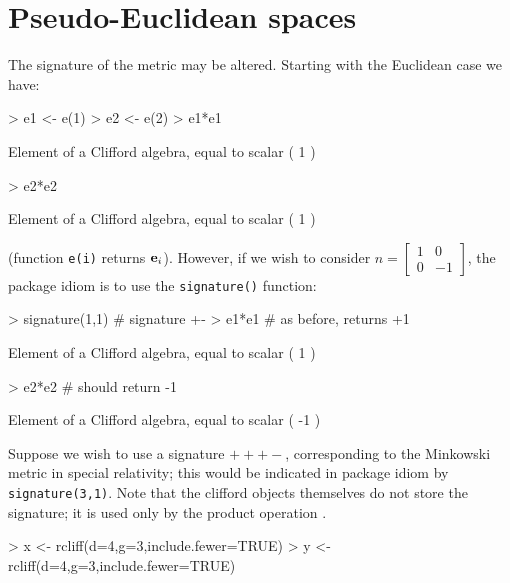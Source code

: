 \documentclass{article}
\begin{document}
\section{Pseudo-Euclidean spaces}

The signature of the metric may be altered.  Starting with the
Euclidean case we have:
    
\begin{Schunk}
\begin{Sinput}
> e1 <- e(1)
> e2 <- e(2)
> e1*e1
\end{Sinput}
\begin{Soutput}
Element of a Clifford algebra, equal to
scalar ( 1 )
\end{Soutput}
\begin{Sinput}
> e2*e2
\end{Sinput}
\begin{Soutput}
Element of a Clifford algebra, equal to
scalar ( 1 )
\end{Soutput}
\end{Schunk}

(function {\tt e(i)} returns ${\bf e}_{i}$).  However, if we wish to
consider $n=\begin{bmatrix}1&0\\0&-1\end{bmatrix}$, the package idiom
is to use the {\tt signature()} function:

\begin{Schunk}
\begin{Sinput}
> signature(1,1)  # signature +-
> e1*e1 # as before, returns +1
\end{Sinput}
\begin{Soutput}
Element of a Clifford algebra, equal to
scalar ( 1 )
\end{Soutput}
\begin{Sinput}
> e2*e2 # should return -1
\end{Sinput}
\begin{Soutput}
Element of a Clifford algebra, equal to
scalar ( -1 )
\end{Soutput}
\end{Schunk}

Suppose we wish to use a signature $+++-$, corresponding to the
Minkowski metric in special relativity; this would be indicated in
package idiom by {\tt signature(3,1)}.  Note that the clifford objects
themselves do not store the signature; it is used only by the product
operation {\tt *}.

\begin{Schunk}
\begin{Sinput}
> x <- rcliff(d=4,g=3,include.fewer=TRUE)
> y <- rcliff(d=4,g=3,include.fewer=TRUE)
\end{Sinput}
\end{Schunk}
\end{document}
